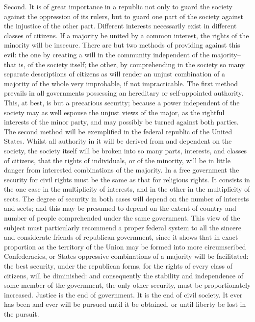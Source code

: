 Second. 
It is of great importance in a republic not only to guard the society against the oppression of its rulers, but to guard one part of the society against the injustice of the other part. 
Different interests necessarily exist in different classes of citizens. 
If a majority be united by a common interest, the rights of the minority will be insecure. 
There are but two methods of providing against this evil: the one by creating a will in the community independent of the majority--that is, of the society itself; the other, by comprehending in the society so many separate descriptions of citizens as will render an unjust combination of a majority of the whole very improbable, if not impracticable. 
The first method prevails in all governments possessing an hereditary or self-appointed authority. 
This, at best, is but a precarious security; because a power independent of the society may as well espouse the unjust views of the major, as the rightful interests of the minor party, and may possibly be turned against both parties. 
The second method will be exemplified in the federal republic of the United States. 
Whilst all authority in it will be derived from and dependent on the society, the society itself will be broken into so many parts, interests, and classes of citizens, that the rights of individuals, or of the minority, will be in little danger from interested combinations of the majority. 
In a free government the security for civil rights must be the same as that for religious rights. 
It consists in the one case in the multiplicity of interests, and in the other in the multiplicity of sects. 
The degree of security in both cases will depend on the number of interests and sects; and this may be presumed to depend on the extent of country and number of people comprehended under the same government. 
This view of the subject must particularly recommend a proper federal system to all the sincere and considerate friends of republican government, since it shows that in exact proportion as the territory of the Union may be formed into more circumscribed Confederacies, or States oppressive combinations of a majority will be facilitated: the best security, under the republican forms, for the rights of every class of citizens, will be diminished: and consequently the stability and independence of some member of the government, the only other security, must be proportionately increased. 
Justice is the end of government. 
It is the end of civil society. 
It ever has been and ever will be pursued until it be obtained, or until liberty be lost in the pursuit. 
